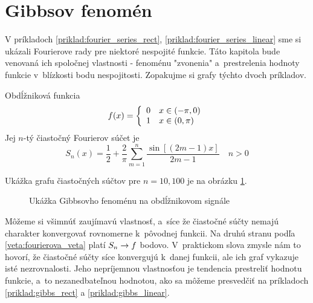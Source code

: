 \section{Gibbsov fenomén}

V príkladoch \ref{priklad:fourier_series_rect},
\ref{priklad:fourier_series_linear}
sme si ukázali Fourierove rady pre niektoré
nespojité funkcie. Táto kapitola bude venovaná ich spoločnej
vlastnosti - fenoménu "zvonenia" a~prestrelenia hodnoty funkcie 
v~blízkosti bodu nespojitosti. Zopakujme si grafy týchto dvoch príkladov.
\begin{priklad}
    Obdĺžniková funkcia
    \begin{equation*}
        f(x) = \left\{
            \begin{array}{l l}
                0 \quad x \in (-\pi,0) \\
                1 \quad x \in (0,\pi)
            \end{array}
        \right.
    \end{equation*}
    Jej $n$-tý čiastočný Fourierov súčet je
    \begin{equation*}
        S_n(x) = \frac{1}{2} + \frac{2}{\pi} \sum_{m=1}^{n}
                \frac{\sin\left[ (2m-1) x\right]}{2m-1} \quad n>0
    \end{equation*}

    Ukážka grafu čiastočných súčtov pre $n=10,100$ je na obrázku
    \ref{fig:gibbs_rect}.
    \begin{figure}[htp]
        \centering
        \caption{Ukážka Gibbsovho fenoménu na obdĺžnikovom signále}
        \label{fig:gibbs_rect}
    \end{figure}
    \label{priklad:gibbs_rect}
\end{priklad}
Môžeme si všimnúť zaujímavú vlastnosť, a~síce že čiastočné súčty
nemajú charakter konvergovať rovnomerne k~pôvodnej funkcii. Na druhú
stranu podľa \ref{veta:fourierova_veta} 
platí $S_n \rightarrow f$ bodovo. V~praktickom slova
zmysle nám to hovorí, že čiastočné súčty síce konvergujú k~danej
funkcii, ale ich graf vykazuje isté nezrovnalosti. Jeho nepríjemnou
vlastnosťou je tendencia prestreliť hodnotu funkcie, a~to
nezanedbateľnou hodnotou, ako sa môžeme presvedčiť na príkladoch
\ref{priklad:gibbs_rect} a \ref{priklad:gibbs_linear}.

